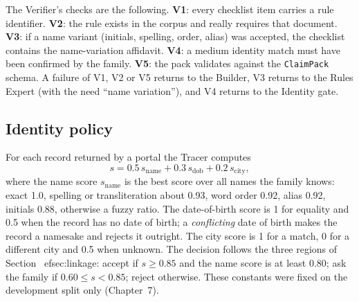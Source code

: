 \documentclass[12pt,a4paper,oneside]{report}
\begin{document}
The Verifier's checks are the following. \textbf{V1}: every checklist item carries a rule identifier. \textbf{V2}: the rule exists in the corpus and really requires that document. \textbf{V3}: if a name variant (initials, spelling, order, alias) was accepted, the checklist contains the name-variation affidavit. \textbf{V4}: a medium identity match must have been confirmed by the family. \textbf{V5}: the pack validates against the \texttt{ClaimPack} schema. A failure of V1, V2 or V5 returns to the Builder, V3 returns to the Rules Expert (with the need ``name variation''), and V4 returns to the Identity gate.

\subsection{Identity policy}\label{sec:identity}
For each record returned by a portal the Tracer computes
\begin{equation}
s = 0.5\,s_{\text{name}} + 0.3\,s_{\text{dob}} + 0.2\,s_{\text{city}},
\end{equation}
where the name score $s_{\text{name}}$ is the best score over all names the family knows: exact 1.0, spelling or transliteration about 0.93, word order 0.92, alias 0.92, initials 0.88, otherwise a fuzzy ratio. The date-of-birth score is 1 for equality and 0.5 when the record has no date of birth; a \emph{conflicting} date of birth makes the record a namesake and rejects it outright. The city score is 1 for a match, 0 for a different city and 0.5 when unknown. The decision follows the three regions of Section~
ef{sec:linkage}: accept if $s\ge 0.85$ and the name score is at least 0.80; ask the family if $0.60\le s<0.85$; reject otherwise. These constants were fixed on the development split only (Chapter~7).
\end{document}

